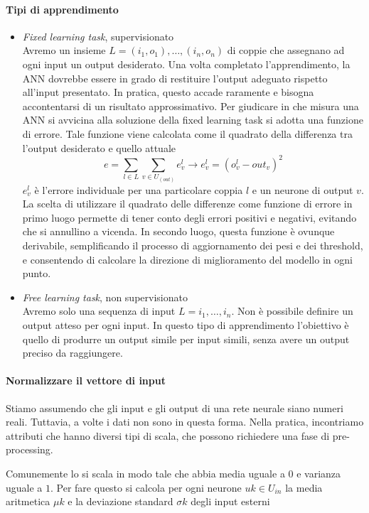 \paragraph{Tipi di apprendimento}
\begin{itemize}
    \item \textit{Fixed learning task}, supervisionato\\
    Avremo un insieme $L={(i_1, o_1), \dots , (i_n, o_n)}$ di coppie che assegnano ad ogni input un output desiderato. Una volta completato l'apprendimento, la ANN dovrebbe essere in grado di restituire l’output adeguato rispetto all’input presentato. In pratica, questo accade raramente e bisogna accontentarsi di un risultato approssimativo. Per giudicare in che misura una ANN si avvicina alla soluzione della fixed learning task si adotta una funzione di errore. Tale funzione viene calcolata come il quadrato della differenza tra l’output desiderato e quello attuale
    $$e = \sum_{l \in L} \sum_{v \in U_{(out)}} e^l_v \rightarrow e^l_v = (o^l_v - out_v)^2$$
    $e^l_v$ è l’errore individuale per una particolare coppia $l$ e un neurone di output $v$. La scelta di utilizzare il quadrato delle differenze come funzione di errore in primo luogo permette di tener conto degli errori positivi e negativi, evitando che si annullino a vicenda. In secondo luogo, questa funzione è ovunque derivabile, semplificando il processo di aggiornamento dei pesi e dei threshold, e consentendo di calcolare la direzione di miglioramento del modello in ogni punto.
    \item \textit{Free learning task}, non supervisionato\\
    Avremo solo una sequenza di input $L={i_1 , \dots , i_n }$. Non è possibile definire un output atteso per ogni input. In questo tipo di apprendimento l'obiettivo è quello di produrre un output simile per input simili, senza avere un output preciso da raggiungere.
\end{itemize}

\paragraph{Normalizzare il vettore di input}
Stiamo assumendo che gli input e gli output di una rete neurale siano numeri reali. Tuttavia, a volte i dati non sono in questa forma. Nella pratica, incontriamo attributi che hanno diversi tipi di scala, che possono richiedere una fase di pre-processing.

Comunemente lo si scala in modo tale che abbia media uguale a $0$ e varianza uguale a $1$. Per fare questo si calcola per ogni neurone $uk \in U_{in}$ la media aritmetica $\mu k$ e la deviazione standard $\sigma k$ degli input esterni

